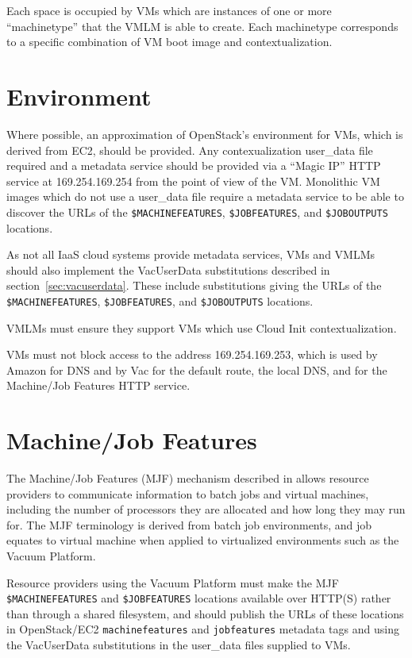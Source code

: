 \documentclass[12pt,a4paper]{article}
\begin{document}
Each space is occupied by VMs which are instances of one or more 
``machinetype'' that the VMLM is able to create. Each machinetype
corresponds to a specific combination of VM boot image and 
contextualization.

\section{Environment}
\label{sec:env}

Where possible, an approximation of OpenStack's environment for VMs, which 
is derived from EC2, should be provided. Any contexualization 
user\_data file required and a metadata service should be provided via a 
``Magic IP'' 
HTTP service at 169.254.169.254 from the point of view of the VM. 
Monolithic VM images which do not use a user\_data file require a 
metadata service to be able to discover the 
URLs of the \texttt{\$MACHINEFEATURES}, \texttt{\$JOBFEATURES}, and 
\texttt{\$JOBOUTPUTS} locations.

As not all IaaS cloud systems provide metadata services, VMs and VMLMs 
should also implement the VacUserData substitutions described 
in section~\ref{sec:vacuserdata}. These include substitutions giving the 
URLs of the \texttt{\$MACHINEFEATURES}, \texttt{\$JOBFEATURES}, and 
\texttt{\$JOBOUTPUTS} locations.

VMLMs must ensure they support VMs which use Cloud Init contextualization.

VMs must not block access to the address 169.254.169.253, which is used
by Amazon for DNS and by Vac for the default route, the local DNS, and 
for the Machine/Job Features HTTP service.

\section{Machine/Job Features}
\label{sec:mjf}

The Machine/Job Features (MJF) mechanism described in \cite{HSFMJF} allows
resource providers to communicate information to batch jobs and virtual
machines, including the number of processors they are allocated and
how long they may run for. The MJF terminology is derived from batch
job environments, and job equates to virtual machine when applied to
virtualized environments such as the Vacuum Platform. 

Resource providers using the Vacuum Platform must make the MJF
\texttt{\$MACHINEFEATURES} and \texttt{\$JOBFEATURES} locations
available over HTTP(S) rather than through a shared filesystem, and
should publish the URLs of these locations in OpenStack/EC2 
\texttt{machinefeatures} and \texttt{jobfeatures} metadata 
tags and using the VacUserData substitutions in the user\_data files
supplied to VMs.
\end{document}
